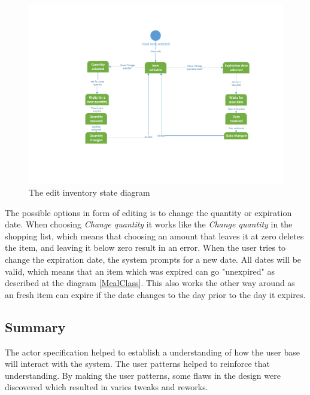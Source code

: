 \begin{figure}[H]
	\centering
	\includegraphics[width=1.0\textwidth]{ApplicationDomain/spEditInventory.pdf} 
	\caption{The edit inventory state diagram}
	\label{spEditInventory}
\end{figure}
The possible options in form of editing is to change the quantity or expiration date. 
When choosing \textit{Change quantity} it works like the \textit{Change quantity} in the shopping list, which means that choosing an amount that leaves it at zero deletes the item, and leaving it below zero result in an error. When the user tries to change the expiration date, the system prompts for a new date. All dates will be valid, which means that an item which was expired can go "unexpired" as described at the diagram \cref{MealClass}. This also works the other way around as an fresh item can expire if the date changes to the day prior to the day it expires.

\subsection*{Summary}
The actor specification helped to establish a understanding of how the user base will interact with the system. The user patterns helped to reinforce that understanding. By making the user patterns, some flaws in the design were discovered which resulted in varies tweaks and reworks.
